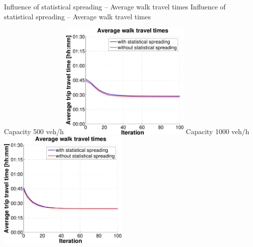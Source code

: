 {}

\createfigure%
{Influence of statistical spreading -- Average walk travel times}%
{Influence of statistical spreading -- Average walk travel times}%
{\label{fig:statisticalSpreadingAvgWalkTravelTimes}}%
{%
  \createsubfigure%
  {Capacity 500 veh/h}%
  {\includegraphics[width=0.47\textwidth, angle=0, trim=0mm 0mm 0mm 9mm, clip=true]{extending/figures/MultiModalSimulation/simulations/avg_walk_traveltime_scatter_500}}%
  {\label{}}%
  {\hspace{3mm}}%
  \createsubfigure%
  {Capacity 1000 veh/h}%
  {\includegraphics[width=0.47\textwidth, angle=0, trim=0mm 0mm 0mm 9mm, clip=true]{extending/figures/MultiModalSimulation/simulations/avg_walk_traveltime_scatter_1000}}%
  {\label{}}%
  {\vspace{7.5mm}}%

}
